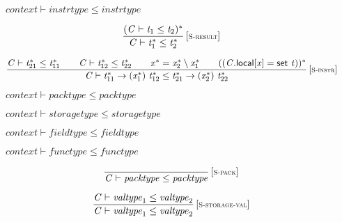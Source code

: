 $\boxed{{\mathit{context}} \vdash {\mathit{instrtype}} \leq {\mathit{instrtype}}}$

$$
\begin{array}{@{}c@{}}\displaystyle
\frac{
({\mathit{C}} \vdash {\mathit{t}}_{{1}} \leq {\mathit{t}}_{{2}})^\ast
}{
{\mathit{C}} \vdash {{\mathit{t}}_{{1}}^\ast} \leq {{\mathit{t}}_{{2}}^\ast}
} \, {[\textsc{\scriptsize S{-}result}]}
\qquad
\end{array}
$$

$$
\begin{array}{@{}c@{}}\displaystyle
\frac{
{\mathit{C}} \vdash {{\mathit{t}}_{{21}}^\ast} \leq {{\mathit{t}}_{{11}}^\ast}
 \qquad
{\mathit{C}} \vdash {{\mathit{t}}_{{12}}^\ast} \leq {{\mathit{t}}_{{22}}^\ast}
 \qquad
{{\mathit{x}}^\ast} = {{\mathit{x}}_{{2}}^\ast} \setminus {{\mathit{x}}_{{1}}^\ast}
 \qquad
(({\mathit{C}}.\mathsf{local}[{\mathit{x}}] = \mathsf{set}~{\mathit{t}}))^\ast
}{
{\mathit{C}} \vdash {{\mathit{t}}_{{11}}^\ast} \rightarrow ({{\mathit{x}}_{{1}}^\ast})~{{\mathit{t}}_{{12}}^\ast} \leq {{\mathit{t}}_{{21}}^\ast} \rightarrow ({{\mathit{x}}_{{2}}^\ast})~{{\mathit{t}}_{{22}}^\ast}
} \, {[\textsc{\scriptsize S{-}instr}]}
\qquad
\end{array}
$$

\vspace{1ex}

$\boxed{{\mathit{context}} \vdash {\mathit{packtype}} \leq {\mathit{packtype}}}$

$\boxed{{\mathit{context}} \vdash {\mathit{storagetype}} \leq {\mathit{storagetype}}}$

$\boxed{{\mathit{context}} \vdash {\mathit{fieldtype}} \leq {\mathit{fieldtype}}}$

$\boxed{{\mathit{context}} \vdash {\mathit{functype}} \leq {\mathit{functype}}}$

$$
\begin{array}{@{}c@{}}\displaystyle
\frac{
}{
{\mathit{C}} \vdash {\mathit{packtype}} \leq {\mathit{packtype}}
} \, {[\textsc{\scriptsize S{-}pack}]}
\qquad
\end{array}
$$

\vspace{1ex}

$$
\begin{array}{@{}c@{}}\displaystyle
\frac{
{\mathit{C}} \vdash {\mathit{valtype}}_{{1}} \leq {\mathit{valtype}}_{{2}}
}{
{\mathit{C}} \vdash {\mathit{valtype}}_{{1}} \leq {\mathit{valtype}}_{{2}}
} \, {[\textsc{\scriptsize S{-}storage{-}val}]}
\qquad
\end{array}
$$

